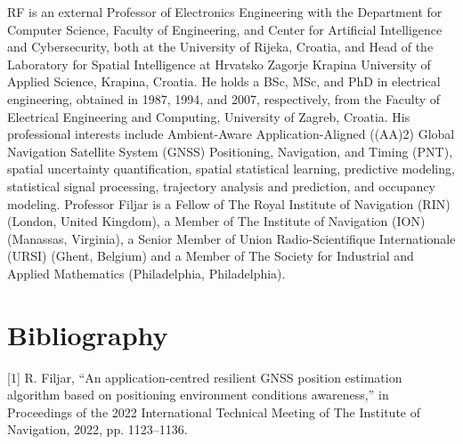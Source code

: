 \documentclass[sn-mathphys-num]{sn-jnl}%
\begin{document}
RF is an external Professor of Electronics Engineering with the Department for Computer Science, Faculty of Engineering, and Center for Artificial Intelligence and Cybersecurity, both at the University of Rijeka, Croatia, and Head of the Laboratory for Spatial Intelligence at Hrvatsko Zagorje Krapina University of Applied Science, Krapina, Croatia. He holds a BSc, MSc, and PhD in electrical engineering, obtained in 1987, 1994, and 2007, respectively, from the Faculty of Electrical Engineering and Computing, University of Zagreb, Croatia. His professional interests include Ambient-Aware Application-Aligned ((AA)2) Global Navigation Satellite System (GNSS) Positioning, Navigation, and Timing (PNT), spatial uncertainty quantification, spatial statistical learning, predictive modeling, statistical signal processing, trajectory analysis and prediction, and occupancy modeling. Professor Filjar is a Fellow of The Royal Institute of Navigation (RIN) (London, United Kingdom), a Member of The Institute of Navigation (ION) (Manassas, Virginia), a Senior Member of Union Radio-Scientifique Internationale (URSI) (Ghent, Belgium) and a Member of The Society for Industrial and Applied Mathematics  (Philadelphia, Philadelphia). %




\section{Bibliography}
[1] R. Filjar, “An application-centred resilient GNSS position estimation algorithm based on positioning environment conditions awareness,” in Proceedings of the 2022 International Technical Meeting of The Institute of Navigation, 2022, pp. 1123–1136.
\end{document}
